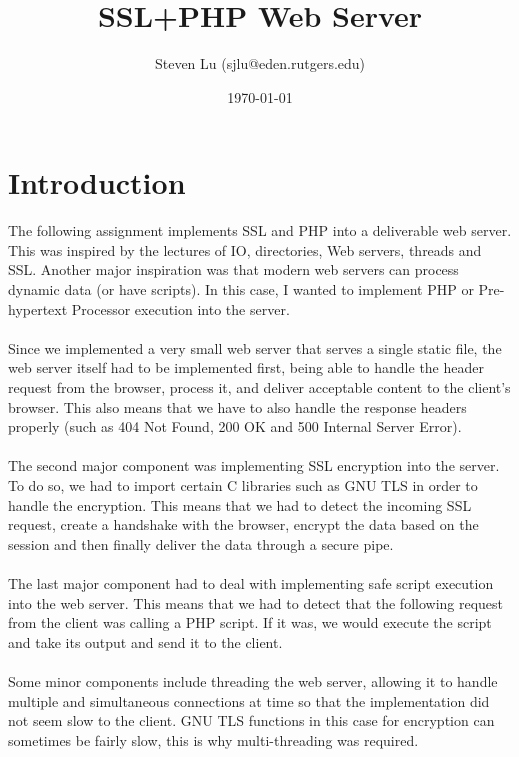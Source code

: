 \documentclass[a4paper,12pt]{article}
\title{SSL+PHP Web Server}
\author{Steven Lu (sjlu@eden.rutgers.edu)}
\date{\today}
\begin{document}
\maketitle
 
\section{Introduction}
 
The following assignment implements SSL and PHP into a deliverable 
web server. This was inspired by the lectures of IO, directories, Web servers,
threads and SSL. Another major inspiration was that modern web servers can
process dynamic data (or have scripts). In this case, I wanted to implement
PHP or Pre-hypertext Processor execution into the server.\\
\\
Since we implemented a very small web server that serves a single static file,
the web server itself had to be implemented first, being able to handle the 
header request from the browser, process it, and deliver acceptable content
to the client's browser. This also means that we have to also handle the
response headers properly (such as 404 Not Found, 200 OK and 500 Internal 
Server Error).\\
\\
The second major component was implementing SSL encryption into the server.
To do so, we had to import certain C libraries such as GNU TLS in order
to handle the encryption. This means that we had to detect the incoming
SSL request, create a handshake with the browser, encrypt the data based
on the session and then finally deliver the data through a secure pipe.\\
\\
The last major component had to deal with implementing safe script execution
into the web server. This means that we had to detect that the following
request from the client was calling a PHP script. If it was, we would
execute the script and take its output and send it to the client.\\
\\
Some minor components include threading the web server, allowing it
to handle multiple and simultaneous connections at time so that the
implementation did not seem slow to the client. GNU TLS functions in 
this case for encryption can sometimes be fairly slow, this is why
multi-threading was required.\\
\\
\end{document}
